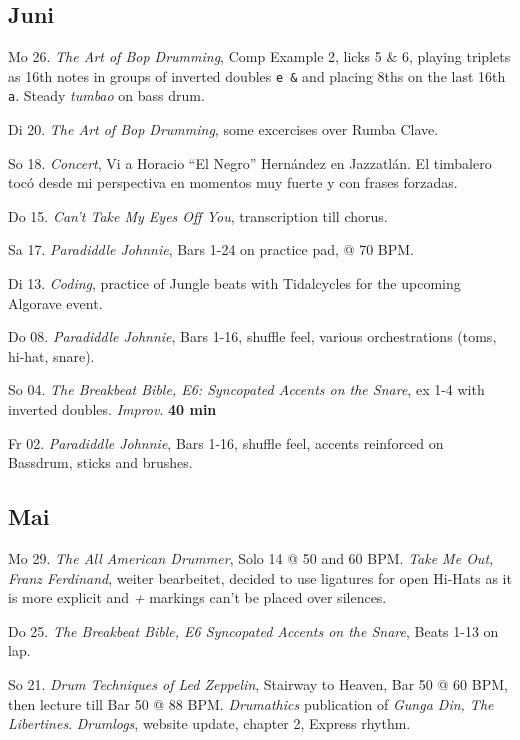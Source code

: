 \documentclass[
]{book}
\begin{document}
\hypertarget{juni-2023}{%
\subsection*{Juni}\label{juni-2023}}

Mo 26. \emph{The Art of Bop Drumming}, Comp Example 2, licks 5 \& 6, playing triplets as 16th notes in groups of inverted doubles \texttt{e\ \&} and placing 8ths on the last 16th \texttt{a}. Steady \emph{tumbao} on bass drum.

\hypertarget{jun262023}{}

Di 20. \emph{The Art of Bop Drumming}, some excercises over Rumba Clave.

So 18. \emph{Concert}, Vi a Horacio ``El Negro'' Hernández en Jazzatlán. El timbalero tocó desde mi perspectiva en momentos muy fuerte y con frases forzadas.

Do 15. \emph{Can't Take My Eyes Off You}, transcription till chorus.

Sa 17. \emph{Paradiddle Johnnie}, Bars 1-24 on practice pad, @ 70 BPM.

Di 13. \emph{Coding}, practice of Jungle beats with Tidalcycles for the upcoming Algorave event.

Do 08. \emph{Paradiddle Johnnie}, Bars 1-16, shuffle feel, various orchestrations (toms, hi-hat, snare).

So 04. \emph{The Breakbeat Bible, E6: Syncopated Accents on the Snare}, ex 1-4 with inverted doubles. \emph{Improv}. \textbf{40 min}

Fr 02. \emph{Paradiddle Johnnie}, Bars 1-16, shuffle feel, accents reinforced on Bassdrum, sticks and brushes.

\hypertarget{mai-2023}{%
\subsection*{Mai}\label{mai-2023}}

Mo 29. \emph{The All American Drummer}, Solo 14 @ 50 and 60 BPM. \emph{Take Me Out, Franz Ferdinand}, weiter bearbeitet, decided to use ligatures for open Hi-Hats as it is more explicit and \emph{+} markings can't be placed over silences.

Do 25. \emph{The Breakbeat Bible, E6 Syncopated Accents on the Snare}, Beats 1-13 on lap.

So 21. \emph{Drum Techniques of Led Zeppelin}, Stairway to Heaven, Bar 50 @ 60 BPM, then lecture till Bar 50 @ 88 BPM. \emph{Drumathics} publication of \emph{Gunga Din, The Libertines}. \emph{Drumlogs}, website update, chapter 2, Express rhythm.
\end{document}
